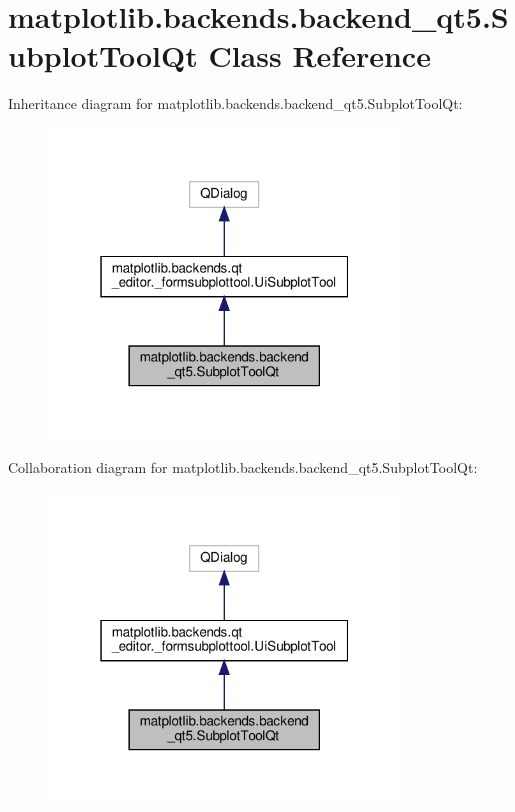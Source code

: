 \hypertarget{classmatplotlib_1_1backends_1_1backend__qt5_1_1SubplotToolQt}{}\section{matplotlib.\+backends.\+backend\+\_\+qt5.\+Subplot\+Tool\+Qt Class Reference}
\label{classmatplotlib_1_1backends_1_1backend__qt5_1_1SubplotToolQt}


Inheritance diagram for matplotlib.\+backends.\+backend\+\_\+qt5.\+Subplot\+Tool\+Qt\+:
\nopagebreak
\begin{figure}[H]
\begin{center}
\leavevmode
\includegraphics[width=265pt]{classmatplotlib_1_1backends_1_1backend__qt5_1_1SubplotToolQt__inherit__graph}
\end{center}
\end{figure}


Collaboration diagram for matplotlib.\+backends.\+backend\+\_\+qt5.\+Subplot\+Tool\+Qt\+:
\nopagebreak
\begin{figure}[H]
\begin{center}
\leavevmode
\includegraphics[width=265pt]{classmatplotlib_1_1backends_1_1backend__qt5_1_1SubplotToolQt__coll__graph}
\end{center}
\end{figure}
